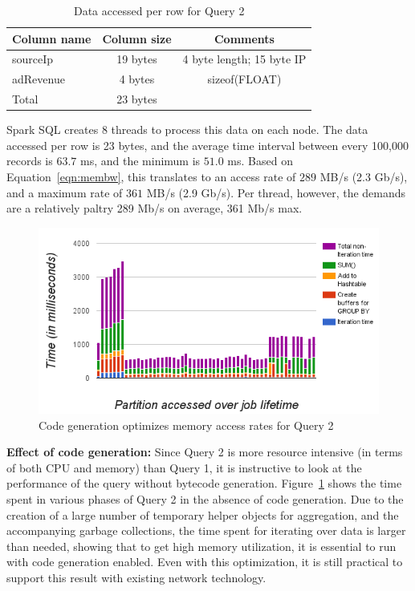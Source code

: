 \documentclass{sig-alternate-05-2015}
\renewcommand{\paragraph}[1]{{\bf #1}}
\begin{document}
\begin{table}
\begin{tabular}[c]{|l|c|c|}
 \hline
 Column name & Column size & Comments \\
 \hline
 sourceIp & 19 bytes & 4 byte length; 15 byte IP \\ \hline
 adRevenue & 4 bytes & sizeof(FLOAT)\\
 \hline
 Total & 23 bytes & \\
 \hline
\end{tabular}
\caption{\label{tbl:data_query2}Data accessed per row for Query 2}
\end{table}

Spark SQL creates 8 threads to process this data on each node.  The data
accessed per row is 23 bytes, and the average time interval between every
100,000 records is $63.7$ ms, and the minimum is $51.0$ ms.  Based on
Equation~\ref{eqn:membw}, this translates to an access rate of $289$ MB/s (2.3
Gb/s), and a maximum rate of $361$ MB/s (2.9 Gb/s).  Per thread, however, the
demands are a relatively paltry 289 Mb/s on average, 361 Mb/s max.

\begin{figure}
\centering
\includegraphics[width=\columnwidth]{group-by-without-codegen}
\caption{\label{fig:codegen}Code generation optimizes memory access rates for Query 2}
\end{figure}

\paragraph{Effect of code generation:} Since Query 2 is more resource intensive
(in terms of both CPU and memory) than Query 1, it is instructive to look at
the performance of the query without bytecode generation.
Figure~\ref{fig:codegen} shows the time spent in various phases of Query 2 in
the absence of code generation. Due to the creation of a large number of
temporary helper objects for aggregation, and the accompanying garbage
collections, the time spent for iterating over data is larger than needed,
showing that to get high memory utilization, it is essential to run with code
generation enabled.  Even with this optimization, it is still practical to
support this result with existing network technology.
\end{document}
